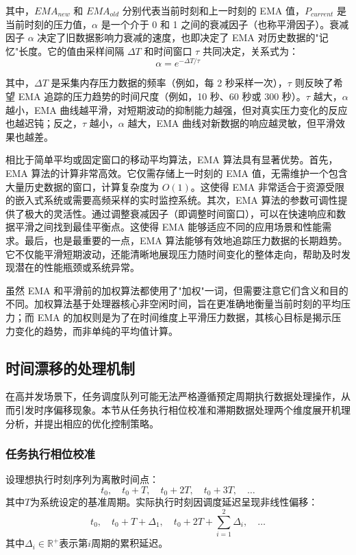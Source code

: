 其中，\(EMA_{new}\) 和 \(EMA_{old}\) 分别代表当前时刻和上一时刻的 EMA 值，\(P_{current}\) 是当前时刻的压力值，\(\alpha\) 是一个介于 0 和 1 之间的衰减因子（也称平滑因子）。衰减因子 \(\alpha\) 决定了旧数据影响力衰减的速度，也即决定了 EMA 对历史数据的"记忆"长度。它的值由采样间隔 \(\Delta T\) 和时间窗口 \(\tau\) 共同决定，关系式为：
\[
\alpha = e^{-\Delta T / \tau}
\]

其中，\(\Delta T\) 是采集内存压力数据的频率（例如，每 2 秒采样一次），\(\tau\) 则反映了希望 EMA 追踪的压力趋势的时间尺度（例如，10 秒、60 秒或 300 秒）。\(\tau\) 越大，\(\alpha\) 越小，EMA 曲线越平滑，对短期波动的抑制能力越强，但对真实压力变化的反应也越迟钝；反之，\(\tau\) 越小，\(\alpha\) 越大，EMA 曲线对新数据的响应越灵敏，但平滑效果也越差。

相比于简单平均或固定窗口的移动平均算法，EMA 算法具有显著优势。首先，EMA 算法的计算非常高效。它仅需存储上一时刻的 EMA 值，无需维护一个包含大量历史数据的窗口，计算复杂度为 \(O(1)\)。这使得 EMA 非常适合于资源受限的嵌入式系统或需要高频采样的实时监控系统。其次，EMA 算法的参数可调性提供了极大的灵活性。通过调整衰减因子（即调整时间窗口），可以在快速响应和数据平滑之间找到最佳平衡点。这使得 EMA 能够适应不同的应用场景和性能需求。最后，也是最重要的一点，EMA 算法能够有效地追踪压力数据的长期趋势。它不仅能平滑短期波动，还能清晰地展现压力随时间变化的整体走向，帮助及时发现潜在的性能瓶颈或系统异常。

虽然 EMA 和平滑前的加权算法都使用了"加权"一词，但需要注意它们含义和目的不同。加权算法基于处理器核心非空闲时间，旨在更准确地衡量当前时刻的平均压力；而 EMA 的加权则是为了在时间维度上平滑压力数据，其核心目标是揭示压力变化的趋势，而非单纯的平均值计算。



\subsection{时间漂移的处理机制}

在高并发场景下，任务调度队列可能无法严格遵循预定周期执行数据处理操作，从而引发时序偏移现象。本节从任务执行相位校准和滞期数据处理两个维度展开机理分析，并提出相应的优化控制策略。

\subsubsection{任务执行相位校准}
设理想执行时刻序列为离散时间点：
\[
t_0, \quad t_0 + T, \quad t_0 + 2T, \quad t_0 + 3T, \quad \dots
\]
其中\(T\)为系统设定的基准周期。实际执行时刻因调度延迟呈现非线性偏移：
\[
t_0, \quad t_0 + T + \Delta_1, \quad t_0 + 2T + \sum_{i=1}^2\Delta_i, \quad \dots
\]
其中\(\Delta_i \in \mathbb{R}^+\)表示第\(i\)周期的累积延迟。

